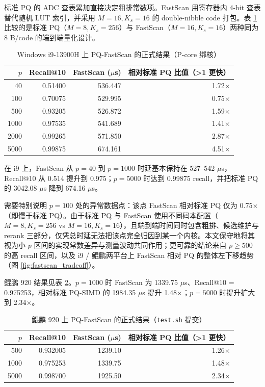 \documentclass[a4paper,11pt,UTF8]{ctexart}
\begin{document}
标准 PQ 的 ADC 查表累加直接决定粗排常数项。FastScan 用寄存器内 4-bit 查表替代随机 LUT 索引，并采用 $M=16,K_s=16$ 的 double-nibble code 打包。表 \ref{tab:fastscan} 比较的是标准 PQ（$M=8,K_s=256$）与 FastScan（$M=16,K_s=16$）两种同为 8 B/code 的端到端量化设计。

\begin{table}[H]
  \centering\small
  \begin{tabular}{rrrr}
    \toprule
    $p$ & Recall@10 & FastScan ($\mu$s) & 相对标准 PQ 比值（>1 更快） \\
    \midrule
    40 & 0.51400 & 536.447 & 1.72$\times$ \\
    100 & 0.70075 & 529.995 & 0.75$\times$ \\
    500 & 0.93205 & 526.872 & 1.59$\times$ \\
    1000 & 0.97535 & 541.689 & 1.41$\times$ \\
    2000 & 0.99265 & 571.850 & 2.87$\times$ \\
    5000 & 0.99875 & 674.161 & 4.51$\times$ \\
    \bottomrule
  \end{tabular}
  \caption{Windows i9-13900H 上 PQ-FastScan 的正式结果（P-core 绑核）}
  \label{tab:fastscan}
\end{table}

在 i9 上，FastScan 从 $p=40$ 到 $p=1000$ 时延基本保持在 527--542 $\mu$s，Recall@10 从 0.514 提升到 0.975；$p=5000$ 时达到 0.99875 recall，并把标准 PQ 的 3042.08 $\mu$s 降到 674.16 $\mu$s。

需要特别说明 $p=100$ 处的异常数据点：该点 FastScan 相对标准 PQ 仅为 0.75$\times$（即慢于标准 PQ）。由于标准 PQ 与 FastScan 使用不同码本配置（$M=8,K_s=256$ vs $M=16,K_s=16$），且端到端时间同时包含粗排、候选维护与 rerank 三部分，仅凭总时延无法把该点完全归因到某一个内核。本文保守地将其视为小 $p$ 区间的实现常数差异与测量波动共同作用；更可靠的结论来自 $p\ge 500$ 的高 recall 区间，以及 i9 / 鲲鹏两平台上 FastScan 相对 PQ 的整体左下移趋势（图 \ref{fig:fastscan_tradeoff}）。

鲲鹏 920 结果见表 \ref{tab:fastscan_kunpeng}。$p=1000$ 时 FastScan 为 1339.75 $\mu$s、Recall@10 = 0.975253，相对标准 PQ-SIMD 的 1984.35 $\mu$s 提升 1.48$\times$；$p=5000$ 时提升扩大到 2.34$\times$。

\begin{table}[H]
  \centering\small
  \begin{tabular}{rrrr}
    \toprule
    $p$ & Recall@10 & FastScan ($\mu$s) & 相对标准 PQ 比值（>1 更快） \\
    \midrule
    500 & 0.932005 & 1239.10 & 1.26$\times$ \\
    1000 & 0.975253 & 1339.75 & 1.48$\times$ \\
    5000 & 0.998700 & 1925.50 & 2.34$\times$ \\
    \bottomrule
  \end{tabular}
  \caption{鲲鹏 920 上 PQ-FastScan 的正式结果（\texttt{test.sh} 提交）}
  \label{tab:fastscan_kunpeng}
\end{table}
\end{document}
